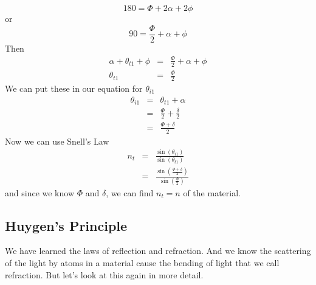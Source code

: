 \documentclass{article}
\begin{document}
\begin{equation}
180=\Phi +2\alpha +2\phi
\end{equation}%
or%
\begin{equation}
90=\frac{\Phi }{2}+\alpha +\phi
\end{equation}%
Then%
\begin{eqnarray}
\alpha +\theta _{t1}+\phi &=&\frac{\Phi }{2}+\alpha +\phi \\
\theta _{t1} &=&\frac{\Phi }{2}
\end{eqnarray}%
We can put these in our equation for $\theta _{i1}$%
\begin{eqnarray}
\theta _{i1} &=&\theta _{t1}+\alpha \\
&=&\frac{\Phi }{2}+\frac{\delta }{2} \\
&=&\frac{\Phi +\delta }{2}
\end{eqnarray}%
Now we can use Snell's Law%
\begin{eqnarray}
n_{t} &=&\frac{\sin \left( \theta _{i1}\right) }{\sin \left( \theta
_{t1}\right) } \\
&=&\frac{\sin \left( \frac{\Phi +\delta }{2}\right) }{\sin \left( \frac{\Phi 
}{2}\right) }
\end{eqnarray}%
and since we know $\Phi $ and $\delta $, we can find $n_{t}=n$ of the
material.

\subsection{Huygen's Principle}

We have learned the laws of reflection and refraction. And we know the
scattering of the light by atoms in a material cause the bending of light
that we call refraction. But let's look at this again in more detail.
\end{document}
